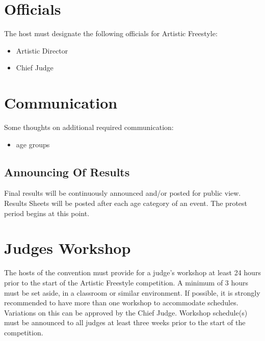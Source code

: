 \section{Officials}

The host must designate the following officials for Artistic Freestyle:
\begin{itemize}
\item Artistic Director
\item Chief Judge
\end{itemize}

\section{Communication}

\begin{comment2016}
Some thoughts on additional required communication:
\begin{itemize}
\item age groups
\end{itemize}
\end{comment2016}

\subsection{Announcing Of Results}

Final results will be continuously announced and/or posted for public view.
Results Sheets will be posted after each age category of an event.
The protest period begins at this point.

\section{Judges Workshop}

The hosts of the convention must provide for a judge's workshop at least 24 hours prior to the start of the Artistic Freestyle competition.
A minimum of 3 hours must be set aside, in a classroom or similar environment. %
If possible, it is strongly recommended to have more than one workshop to accommodate schedules. %
Variations on this can be approved by the Chief Judge.
Workshop schedule(s) must be announced to all judges at least three weeks prior to the start of the competition.

